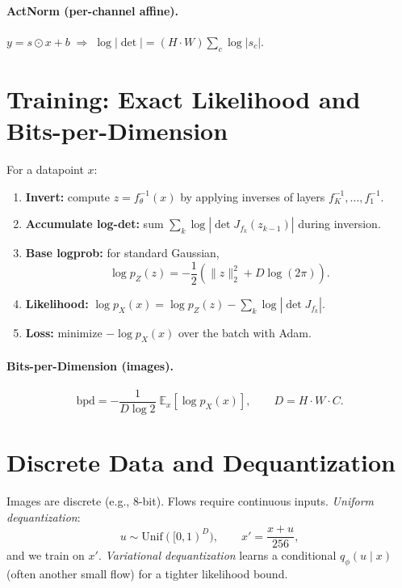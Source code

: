 \documentclass[11pt]{article}
\newcommand{\E}{\mathbb{E}}
\theoremstyle{remark}
\begin{document}
\paragraph{ActNorm (per-channel affine).}
$y = s \odot x + b \;\Rightarrow\; \log|\det| = (H\cdot W)\sum_c \log|s_c|$.

\section{Training: Exact Likelihood and Bits-per-Dimension}
For a datapoint $x$:

\begin{enumerate}[leftmargin=1.5em,label=\textbf{Step \arabic*.}]
\item \textbf{Invert:} compute $z=f_\theta^{-1}(x)$ by applying inverses of layers $f_K^{-1},\ldots,f_1^{-1}$.
\item \textbf{Accumulate log-det:} sum $\sum_k \log|\det J_{f_k}(z_{k-1})|$ during inversion.
\item \textbf{Base logprob:} for standard Gaussian,
\begin{equation}
\log p_Z(z) = -\frac{1}{2}\left( \|z\|_2^2 + D\log(2\pi) \right).
\label{eq:base-gauss}
\end{equation}
\item \textbf{Likelihood:} $\log p_X(x) = \log p_Z(z) - \sum_k \log|\det J_{f_k}|$.
\item \textbf{Loss:} minimize $-\log p_X(x)$ over the batch with Adam.
\end{enumerate}

\paragraph{Bits-per-Dimension (images).}
\begin{equation}
\mathrm{bpd}
= -\frac{1}{D\log 2}\; \E_{x}\left[\log p_X(x)\right],\qquad D=H\cdot W\cdot C.
\label{eq:bpd}
\end{equation}

\section{Discrete Data and Dequantization}
Images are discrete (e.g., 8-bit). Flows require continuous inputs. \emph{Uniform dequantization}:
\begin{equation}
u \sim \mathrm{Unif}([0,1)^D), \qquad x' = \frac{x + u}{256},
\label{eq:uniform-deq}
\end{equation}
and we train on $x'$. \emph{Variational dequantization} learns a conditional $q_\phi(u\mid x)$ (often another small flow) for a tighter likelihood bound.
\end{document}
